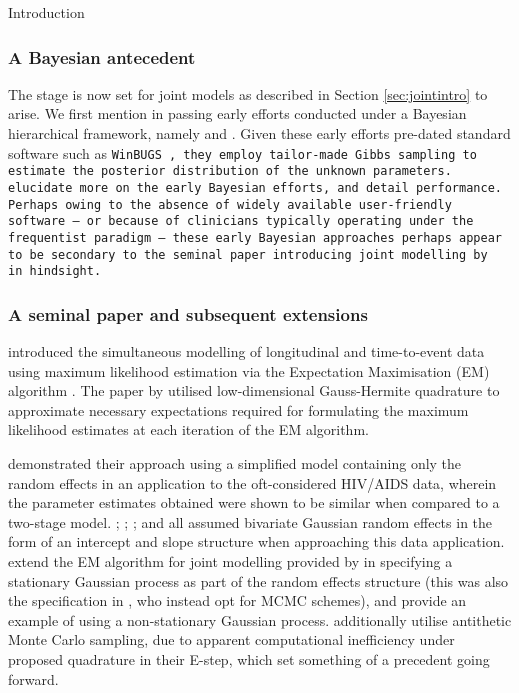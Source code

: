 \begin{chapter}{\label{cha:intro}Introduction}
  \subsubsection*{A Bayesian antecedent}
  \addtocounter{subsubsection}{1}
  The stage is now set for joint models as described in Section \ref{sec:jointintro} to arise. We first mention in passing early efforts conducted under a Bayesian hierarchical framework, namely \citet{Berzuini1996} and \citet{Faucett1996}. Given these early efforts pre-dated standard software such as \tt{WinBUGS} \citep{Winbugs-manual}, they employ tailor-made Gibbs sampling to estimate the posterior distribution of the unknown parameters. \citet{Sweeting2011} elucidate more on the early Bayesian efforts, and detail performance. Perhaps owing to the absence of widely available user-friendly software -- or because of clinicians typically operating under the frequentist paradigm -- these early Bayesian approaches perhaps appear to be secondary to the seminal paper introducing joint modelling by \citet{Wulfsohn97} in hindsight.
  
  \subsubsection*{A seminal paper and subsequent extensions}
  \addtocounter{subsubsection}{1}
  \citet{Wulfsohn97} introduced the simultaneous modelling of longitudinal and time-to-event data using maximum likelihood estimation via the Expectation Maximisation (EM) algorithm \citep{Dempster77}. The paper by \citet{Wulfsohn97} utilised low-dimensional Gauss-Hermite quadrature to approximate necessary expectations required for formulating the maximum likelihood estimates at each iteration of the EM algorithm. 
  
  \citet{Wulfsohn97} demonstrated their approach using a simplified model containing only the random effects in an application to the oft-considered HIV/AIDS data, wherein the parameter estimates obtained were shown to be similar when compared to a two-stage model. \citet{Tsiatis1995}; \citet{Faucett1996}; \citet{Bycott1998}; \citet{Dafni1998} and \citet{Wulfsohn97} all assumed bivariate Gaussian random effects in the form of an intercept and slope structure when approaching this data application. \citet{Henderson2000} extend the EM algorithm for joint modelling provided by \citet{Wulfsohn97} in specifying a stationary Gaussian process as part of the random effects structure (this was also the specification in \citet{Xu2001}, who instead opt for MCMC schemes), and \citet{Wang2001} provide an example of using a non-stationary Gaussian process. \citet{Henderson2000} additionally utilise antithetic Monte Carlo sampling, due to apparent computational inefficiency under proposed quadrature in their E-step, which set something of a precedent going forward.


\end{chapter}
